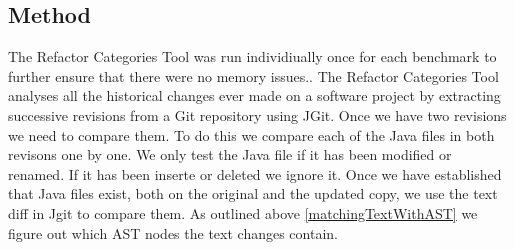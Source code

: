 % 

\subsection{Method}
The Refactor Categories Tool was run individiually once for each benchmark to further ensure that there were no memory issues..  The Refactor Categories Tool analyses all the historical changes ever made on a software project by extracting successive revisions from a Git repository using JGit.  Once we have two revisions we need to compare them.  To do this we compare each of the Java files in both revisons one by one. We only test the Java file if it has been modified or renamed.  If it has been inserte or deleted we ignore it. Once we have established that Java files exist, both on the original and the updated copy, we use the text diff in Jgit to compare them. As outlined above \ref{matchingTextWithAST} we figure out which AST nodes the text changes contain. 

